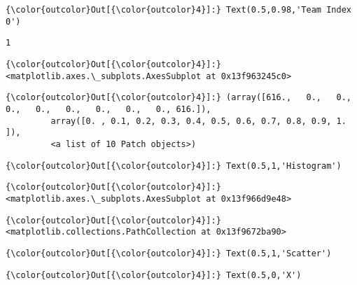 \documentclass[11pt]{article}
\begin{document}
\begin{Verbatim}[commandchars=\\\{\}]
{\color{outcolor}Out[{\color{outcolor}4}]:} Text(0.5,0.98,'Team Index 0')
\end{Verbatim}
            
    \begin{Verbatim}[commandchars=\\\{\}]
1

    \end{Verbatim}

\begin{Verbatim}[commandchars=\\\{\}]
{\color{outcolor}Out[{\color{outcolor}4}]:} <matplotlib.axes.\_subplots.AxesSubplot at 0x13f963245c0>
\end{Verbatim}
            
\begin{Verbatim}[commandchars=\\\{\}]
{\color{outcolor}Out[{\color{outcolor}4}]:} (array([616.,   0.,   0.,   0.,   0.,   0.,   0.,   0.,   0., 616.]),
         array([0. , 0.1, 0.2, 0.3, 0.4, 0.5, 0.6, 0.7, 0.8, 0.9, 1. ]),
         <a list of 10 Patch objects>)
\end{Verbatim}
            
\begin{Verbatim}[commandchars=\\\{\}]
{\color{outcolor}Out[{\color{outcolor}4}]:} Text(0.5,1,'Histogram')
\end{Verbatim}
            
\begin{Verbatim}[commandchars=\\\{\}]
{\color{outcolor}Out[{\color{outcolor}4}]:} <matplotlib.axes.\_subplots.AxesSubplot at 0x13f966d9e48>
\end{Verbatim}
            
\begin{Verbatim}[commandchars=\\\{\}]
{\color{outcolor}Out[{\color{outcolor}4}]:} <matplotlib.collections.PathCollection at 0x13f9672ba90>
\end{Verbatim}
            
\begin{Verbatim}[commandchars=\\\{\}]
{\color{outcolor}Out[{\color{outcolor}4}]:} Text(0.5,1,'Scatter')
\end{Verbatim}
            
\begin{Verbatim}[commandchars=\\\{\}]
{\color{outcolor}Out[{\color{outcolor}4}]:} Text(0.5,0,'X')
\end{Verbatim}
            
\end{document}
